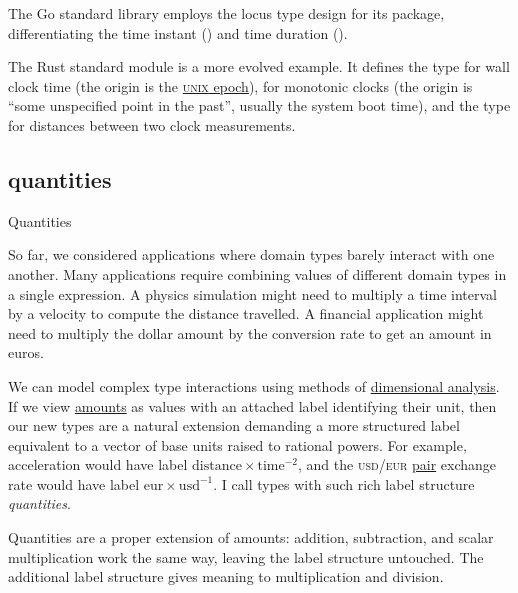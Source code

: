 \documentclass{article}
\begin{document}
The Go standard library employs the locus type design for its \href{https://pkg.go.dev/time}{} package, differentiating the time instant (\href{https://pkg.go.dev/time#Time}{}) and time duration (\href{https://pkg.go.dev/time#Duration}{}).

The Rust standard module \href{https://doc.rust-lang.org/std/time/index.html}{} is a more evolved example.
It defines the \href{https://doc.rust-lang.org/std/time/struct.SystemTime.html}{} type for wall clock time (the origin is the \href{https://doc.rust-lang.org/std/time/struct.SystemTime.html#associatedconstant.UNIX_EPOCH}{\textsc{unix} epoch}), \href{https://doc.rust-lang.org/std/time/struct.Instant.html}{} for monotonic clocks (the origin is ``some unspecified point in the past'', usually the system boot time), and the \href{https://doc.rust-lang.org/std/time/struct.Duration.html}{} type for distances between two clock measurements.

\subsection{quantities}{Quantities}

So far, we considered applications where domain types barely interact with one another.
Many applications require combining values of different domain types in a single expression.
A physics simulation might need to multiply a time interval by a velocity to compute the distance travelled.
A financial application might need to multiply the dollar amount by the conversion rate to get an amount in euros.

We can model complex type interactions using methods of \href{https://en.wikipedia.org/wiki/Dimensional_analysis}{dimensional analysis}.
If we view \href{#amounts}{amounts} as values with an attached label identifying their unit, then our new types are a natural extension demanding a more structured label equivalent to a vector of base units raised to rational powers.
For example, acceleration would have label $\mathrm{distance} \times  \mathrm{time}^{-2}$, and the \textsc{usd}/\textsc{eur} \href{https://en.wikipedia.org/wiki/Currency_pair}{pair} exchange rate would have label $\mathrm{eur} \times  \mathrm{usd}^{-1}$.
I call types with such rich label structure \emph{quantities}.

Quantities are a proper extension of amounts: addition, subtraction, and scalar multiplication work the same way, leaving the label structure untouched.
The additional label structure gives meaning to multiplication and division.
\end{document}
